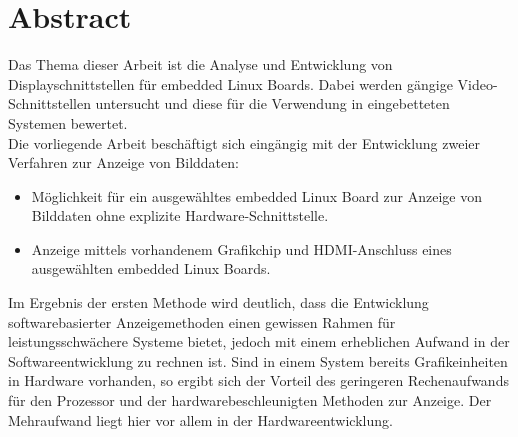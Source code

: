 \section*{Abstract}
\label{sec:Abstract}
Das Thema dieser Arbeit ist die Analyse und  Entwicklung von Displayschnittstellen für embedded Linux Boards. Dabei werden gängige Video-Schnittstellen untersucht und diese für die Verwendung in eingebetteten Systemen bewertet.\\
Die vorliegende Arbeit beschäftigt sich eingängig mit der Entwicklung zweier Verfahren zur Anzeige von Bilddaten:
\begin{itemize}
\item Möglichkeit für ein ausgewähltes embedded Linux Board zur Anzeige von Bilddaten ohne explizite Hardware-Schnittstelle.
\item Anzeige mittels vorhandenem Grafikchip und HDMI-Anschluss eines ausgewählten embedded Linux Boards.
\end{itemize}
Im Ergebnis der ersten Methode wird deutlich, dass die Entwicklung softwarebasierter Anzeigemethoden einen gewissen Rahmen für leistungsschwächere Systeme bietet, jedoch mit einem erheblichen Aufwand in der Softwareentwicklung zu rechnen ist. Sind in einem System bereits Grafikeinheiten in Hardware vorhanden, so ergibt sich der Vorteil des geringeren Rechenaufwands für den Prozessor und der hardwarebeschleunigten Methoden zur Anzeige. Der Mehraufwand liegt hier vor allem in der Hardwareentwicklung.